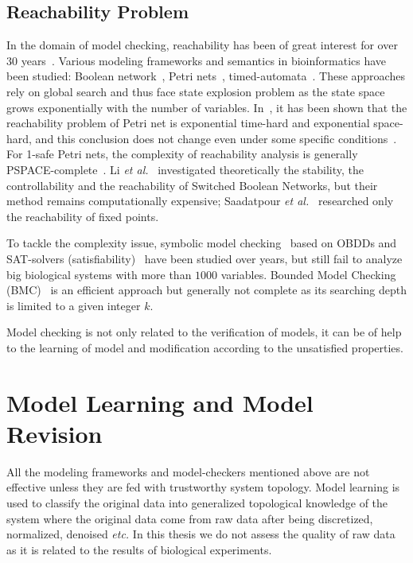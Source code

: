 \subsection{Reachability Problem}
In the domain of model checking, reachability has been of great interest for over 30 years~\cite{clarke2008birth,clarke20142}. 
Various modeling frameworks and semantics in bioinformatics have been studied: Boolean network~\cite{akutsu2007control}, Petri nets~\cite{mayr1984,esparza1998}, timed-automata~\cite{Daws1998,wozna2003}. 
These approaches rely on global search and thus face state explosion problem as the state space grows exponentially with the number of variables. 
In~\cite{peterson1977petri}, it has been shown that the reachability problem of Petri net is exponential time-hard and exponential space-hard, and this conclusion does not change even under some specific conditions~\cite{esparza1998}. 
For 1-safe Petri nets, the complexity of reachability analysis is generally PSPACE-complete~\cite{cheng1995complexity}.
Li \textit{et al.}~\cite{li2012reachability,li2014stability} investigated theoretically the stability, the controllability and the reachability of Switched Boolean Networks, but their method remains computationally expensive;
Saadatpour \textit{et al.}~\cite{saadatpour2010attractor} researched only the reachability of fixed points.

To tackle the complexity issue, symbolic model checking~\cite{burch1992symbolic} based on OBDDs and SAT-solvers (satisfiability)~\cite{abdulla2000symbolic} have been studied over years, but still fail to analyze big biological systems with more than $1000$ variables. 
Bounded Model Checking (BMC)~\cite{clarke2001bounded} is an efficient approach but generally not complete as its searching depth is limited to a given integer $k$.

Model checking is not only related to the verification of models, it can be of help to the learning of model and modification according to the unsatisfied properties.

\section{Model Learning and Model Revision}
All the modeling frameworks and model-checkers mentioned above are not effective unless they are fed with trustworthy system topology.
Model learning is used to classify the original data into generalized topological knowledge of the system where the original data come from raw data after being discretized, normalized, denoised \textit{etc.}
In this thesis we do not assess the quality of raw data as it is related to the results of biological experiments.

